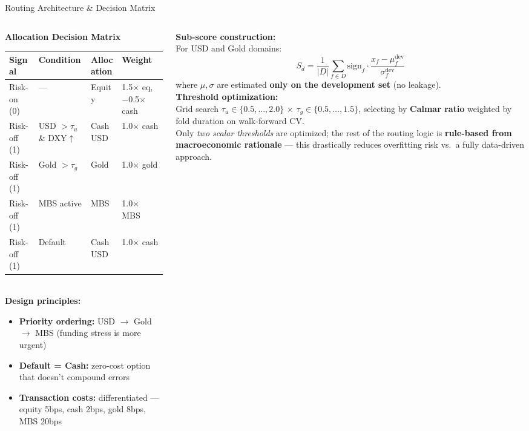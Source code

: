 \documentclass[aspectratio=169, 11pt]{beamer}
\begin{document}
\begin{frame}{Routing Architecture \& Decision Matrix}
\begin{columns}[T]
\begin{column}{0.52\textwidth}
  \textbf{Allocation Decision Matrix}\\[0.2cm]
  \footnotesize
  \begin{tabular}{llll}
    \toprule
    \textbf{Signal} & \textbf{Condition} & \textbf{Allocation} & \textbf{Weight}\\
    \midrule
    Risk-on (0) & --- & Equity & 1.5$\times$ eq, $-$0.5$\times$ cash\\
    Risk-off (1) & USD $> \tau_u$ \& DXY$\uparrow$ & Cash USD & 1.0$\times$ cash\\
    Risk-off (1) & Gold $> \tau_g$ & Gold & 1.0$\times$ gold\\
    Risk-off (1) & MBS active & MBS & 1.0$\times$ MBS\\
    Risk-off (1) & Default & Cash USD & 1.0$\times$ cash\\
    \bottomrule
  \end{tabular}\\[0.4cm]

  \normalsize
  \textbf{Design principles:}
  \begin{itemize}\setlength\itemsep{0.1cm}
    \item \textbf{Priority ordering:} USD $\rightarrow$ Gold $\rightarrow$ MBS (funding stress is more urgent)
    \item \textbf{Default = Cash:} zero-cost option that doesn't compound errors
    \item \textbf{Transaction costs:} differentiated --- equity 5bps, cash 2bps, gold 8bps, MBS 20bps
  \end{itemize}
\end{column}
\begin{column}{0.46\textwidth}
  \textbf{Sub-score construction:}\\[0.1cm]
  \footnotesize
  For USD and Gold domains:
  \[
    S_d = \frac{1}{|D|} \sum_{f \in D} \text{sign}_f \cdot \frac{x_f - \mu_f^{\text{dev}}}{\sigma_f^{\text{dev}}}
  \]
  where $\mu, \sigma$ are estimated \textbf{only on the development set} (no leakage).\\[0.3cm]

  \normalsize
  \textbf{Threshold optimization:}\\
  \footnotesize
  Grid search $\tau_u \in \{0.5, \ldots, 2.0\}$ $\times$ $\tau_g \in \{0.5, \ldots, 1.5\}$, selecting by \textbf{Calmar ratio} weighted by fold duration on walk-forward CV.\\[0.2cm]

  Only \textit{two scalar thresholds} are optimized; the rest of the routing logic is \textbf{rule-based from macroeconomic rationale} --- this drastically reduces overfitting risk vs.\ a fully data-driven approach.
\end{column}
\end{columns}
\end{frame}
\end{document}

